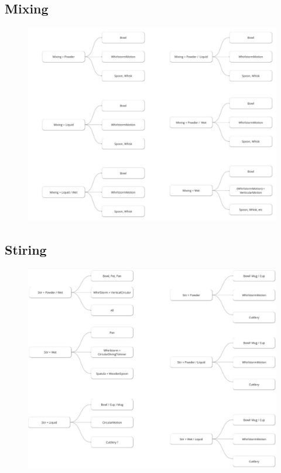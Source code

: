 \subsection*{Mixing}
\begin{figure}[H]
\includegraphics[scale=0.5]{Graphics/MixingDT.pdf}
\end{figure}

\subsection*{Stiring}
\begin{figure}[H]
\includegraphics[scale=0.4]{Graphics/StirringDT.jpg}
\end{figure}


